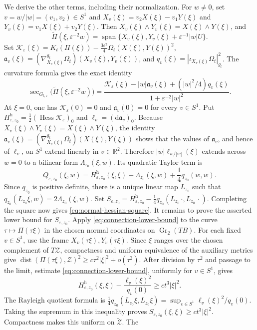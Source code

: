 \documentclass[11pt]{article}
\theoremstyle{definition}
\theoremstyle{remark}
\newcommand{\R}{\mathbb R}
\newcommand{\cZ}{\mathcal Z}
\newcommand{\tZ}{\widetilde{\mathcal Z}}
\newcommand{\Gr}{\operatorname{Gr}}
\newcommand{\Span}{\operatorname{span}}
\newcommand{\dist}{\operatorname{dist}}
\newcommand{\dd}{\mathrm d}
\newcommand{\eps}{\varepsilon}
\begin{document}
We derive the other terms, including their normalization.  For $w\neq0$, set
$v=w/|w|=(v_1,v_2)\in S^1$ and
$X_v(\xi)=v_2X(\xi)-v_1Y(\xi)$ and
$Y_v(\xi)=v_1X(\xi)+v_2Y(\xi)$.  Then
$X_v(\xi)\wedge Y_v(\xi)=X(\xi)\wedge Y(\xi)$, and
\[
 \widetilde\Pi(\xi,\eps^{-2}w)
 =\Span\{X_v(\xi),Y_v(\xi)+\eps^{-1}|w|U\}.
\]
Set
$\mathcal K_\eps(\xi)=K_t(\Pi(\xi))-\tfrac{3\eps^2}{4}
\Omega_t(X(\xi),Y(\xi))^2$,
$\mathfrak a_v(\xi)=(\nabla_{X_v(\xi)}^{g_t}\Omega_t)(X_v(\xi),Y_v(\xi))$, and
$q_v(\xi)=|\iota_{X_v(\xi)}\Omega_t|_{g_t}^2$.
The curvature formula gives the exact identity
\[
 \sec_{G_{t,\eps}}\bigl(\widetilde\Pi(\xi,\eps^{-2}w)\bigr)
 =\frac{\mathcal K_\eps(\xi)-|w|\mathfrak a_v(\xi)+(|w|^2/4)q_v(\xi)}
 {1+\eps^{-2}|w|^2}.
\]
At $\xi=0$, one has $\mathcal K_\eps(0)=0$ and
$\mathfrak a_v(0)=0$ for every $v\in S^1$.  Put
$H^{\mathrm h}_{\eps,z_0}
=\tfrac12(\operatorname{Hess}\mathcal K_\eps)_0$ and
$\ell_v=(\dd\mathfrak a_v)_0$.  Because
$X_v(\xi)\wedge Y_v(\xi)=X(\xi)\wedge Y(\xi)$, the identity
$\mathfrak a_v(\xi)=(\nabla_{X_v(\xi)}^{g_t}\Omega_t)(X(\xi),Y(\xi))$ shows that the values of
$\mathfrak a_v$, and hence of $\ell_v$, on $S^1$ extend linearly in $v\in\R^2$.  Therefore
$|w|\ell_{w/|w|}(\xi)$ extends across $w=0$ to a bilinear form
$\Lambda_{z_0}(\xi,w)$.  Its quadratic Taylor term is
\[
 Q_{\eps,z_0}(\xi,w)
 =H^{\mathrm h}_{\eps,z_0}(\xi,\xi)-\Lambda_{z_0}(\xi,w)
   +\frac14q_{z_0}(w,w).
\]
Since $q_{z_0}$ is positive definite, there is a unique linear map $L_{z_0}$
such that $q_{z_0}(L_{z_0}\xi,w)=2\Lambda_{z_0}(\xi,w)$.  Set
$S_{\eps,z_0}=H^{\mathrm h}_{\eps,z_0}
-\tfrac14q_{z_0}(L_{z_0}\,\cdot,L_{z_0}\,\cdot)$.  Completing the square now gives
\eqref{eq:normal-hessian-square}.
It remains to prove the asserted lower bound for $S_{\eps,z_0}$.  Apply
\eqref{eq:connection-lower-bound} to the curve
$\tau\mapsto\Pi(\tau\xi)$ in the chosen normal coordinates on
$\Gr_2(TB)$.  For each fixed $v\in S^1$, use the frame
$X_v(\tau\xi),Y_v(\tau\xi)$.  Since $\xi$ ranges over the chosen complement
of $T\cZ$, compactness and uniform equivalence of the auxiliary metrics give
$\dist(\Pi(\tau\xi),\cZ)^2\geq c\tau^2|\xi|^2+o(\tau^2)$.
After division by $\tau^2$ and passage to the limit, estimate
\eqref{eq:connection-lower-bound}, uniformly for $v\in S^1$, gives
\[
 H^{\mathrm h}_{\eps,z_0}(\xi,\xi)
 -\frac{\ell_v(\xi)^2}{q_v(0)}
 \geq ct^3|\xi|^2.
\]
The Rayleigh quotient formula is
$\tfrac14q_{z_0}(L_{z_0}\xi,L_{z_0}\xi)
=\sup_{v\in S^1}\ell_v(\xi)^2/q_v(0)$.
Taking the supremum in this inequality proves
$S_{\eps,z_0}(\xi,\xi)\geq ct^3|\xi|^2$.  Compactness makes this uniform on $\tZ$.  The
\end{document}
